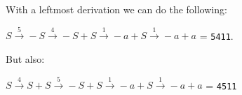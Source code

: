 \noindent
With a leftmost derivation we can do the following: 
\begin{center}
    $S \xrightarrow{5} -S \xrightarrow{4} -S+S \xrightarrow{1} -a+S \xrightarrow{1} -a+a$ = \texttt{5411}. \\
\end{center}
But also: 
\begin{center}
    $S \xrightarrow{4} S+S \xrightarrow{5} -S+S \xrightarrow{1} -a+S \xrightarrow{1} -a+a$ = \texttt{4511}
\end{center}